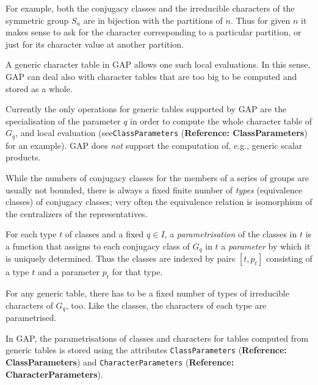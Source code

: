\documentclass[a4paper,11pt]{report}
\begin{document}
{{ For example, both the conjugacy classes and the irreducible characters of the
symmetric group $S_n$ are in bijection with the partitions of $n$. Thus for given $n$ it makes sense to ask for the character corresponding to a particular
partition, or just for its character value at another partition. 

 A generic character table in \textsf{GAP} allows one such local evaluations. In this sense, \textsf{GAP} can deal also with character tables that are too big to be computed and stored
as a whole. 

 Currently the only operations for generic tables supported by \textsf{GAP} are the specialisation of the parameter $q$ in order to compute the whole character table of $G_q$, and local evaluation (see{\nobreakspace}\texttt{ClassParameters} (\textbf{Reference: ClassParameters}) for an example). \textsf{GAP} does \emph{not} support the computation of, e.{\nobreakspace}g., generic scalar products. 

 While the numbers of conjugacy classes for the members of a series of groups
are usually not bounded, there is always a fixed finite number of \emph{types} (equivalence classes) of conjugacy classes; very often the equivalence
relation is isomorphism of the centralizers of the representatives. 

 For each type $t$ of classes and a fixed $q \in I$, a \emph{parametrisation} of the classes in $t$ is a function that assigns to each conjugacy class of $G_q$ in $t$ a \emph{parameter} by which it is uniquely determined. Thus the classes are indexed by pairs $[t,p_t]$ consisting of a type $t$ and a parameter $p_t$ for that type. 

 For any generic table, there has to be a fixed number of types of irreducible
characters of $G_q$, too. Like the classes, the characters of each type are parametrised. 

 In \textsf{GAP}, the parametrisations of classes and characters for tables computed from
generic tables is stored using the attributes \texttt{ClassParameters} (\textbf{Reference: ClassParameters}) and \texttt{CharacterParameters} (\textbf{Reference: CharacterParameters}).  
}}
\end{document}
